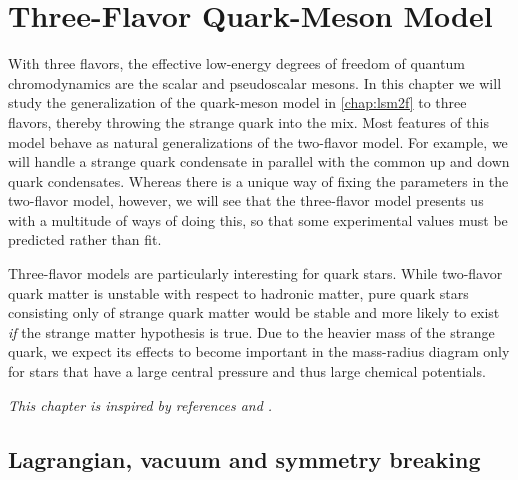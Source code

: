 \chapter{Three-Flavor Quark-Meson Model}
\label{chap:lsm3f}

With three flavors, the effective low-energy degrees of freedom of quantum chromodynamics are the scalar and pseudoscalar mesons. %
In this chapter we will study the generalization of the quark-meson model in \cref{chap:lsm2f} to three flavors,
thereby throwing the strange quark into the mix.
Most features of this model behave as natural generalizations of the two-flavor model.
For example, we will handle a strange quark condensate in parallel with the common up and down quark condensates.
Whereas there is a unique way of fixing the parameters in the two-flavor model, however,
we will see that the three-flavor model presents us with a multitude of ways of doing this,
so that some experimental values must be predicted rather than fit.

Three-flavor models are particularly interesting for quark stars.
While two-flavor quark matter is unstable with respect to hadronic matter,
pure quark stars consisting only of strange quark matter would be stable and more likely to exist
\emph{if} the strange matter hypothesis is true.
Due to the heavier mass of the strange quark,
we expect its effects to become important in the mass-radius diagram
only for stars that have a large central pressure and thus large chemical potentials.

\textit{This chapter is inspired by references \cite{ref:lsm3f} and \cite{ref:lsm3f_details}.}

\section{Lagrangian, vacuum and symmetry breaking}

